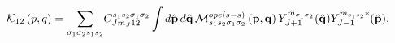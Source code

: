 \begin{equation}
\mathcal{K}_{12}\left( p,q\right) =\underset{\sigma _{1}\sigma _{2}s_{1}s_{2}%
}{\sum }C_{Jm_{J}12}^{s_{1}s_{2}\sigma _{1}\sigma _{2}}\int d\hat{%
\mathbf{p}}\,d\hat{\mathbf{q}}\,\mathcal{M}_{s_{1}s_{2}\sigma _{1}\sigma
_{2}}^{ope\left( s-s\right) }\left( \mathbf{p,q}\right) Y_{J+1}^{m_{\sigma
_{1}\sigma _{2}}}(\hat{\mathbf{q}})Y_{J-1}^{m_{s_{1}s_{2}}\ast }(%
\hat{\mathbf{p}}).
\end{equation}


